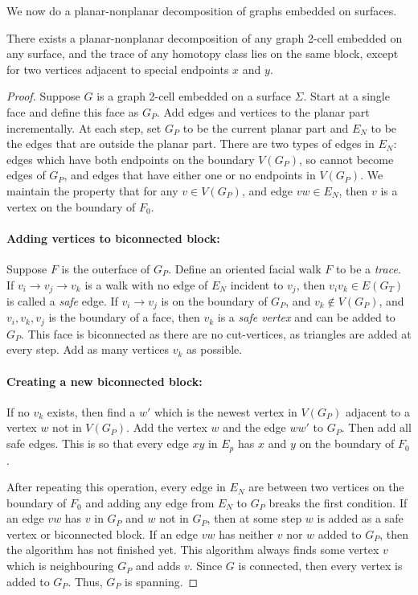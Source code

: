 We now do a planar-nonplanar decomposition of graphs embedded on surfaces.
\begin{proposition}\label{claim:planar_nonplanar_decomp}
	There exists a planar-nonplanar decomposition of any graph 2-cell embedded on any surface, and the trace of any homotopy class lies on the same block, except for two vertices adjacent to special endpoints $x$ and $y$. 
\end{proposition}
\begin{proof}
	Suppose \(G\) is a graph 2-cell embedded on a surface \(\Sigma\). Start at a single face and define this face as $G_P$. Add edges and vertices to the planar part incrementally. At each step, set \(G_P\) to be the current planar part and \(E_N\) to be the edges that are outside the planar part. There are two types of edges in \(E_N\): edges which have both endpoints on the boundary \(V(G_P)\), so cannot become edges of \(G_P\), and edges that have either one or no endpoints in \(V(G_P)\). We maintain the property that for any \(v \in V(G_P)\), and edge \(vw \in E_N\), then \(v\) is a vertex on the boundary of \(F_0\).
	\paragraph{Adding vertices to biconnected block:}
	Suppose $F$ is the outerface of \(G_P\). Define an oriented facial walk $F$ to be a \textit{trace}. If \(v_i \rightarrow v_j \rightarrow v_k\) is a walk with no edge of \(E_N\) incident to \(v_j\), then \(v_i v_k \in E(G_T)\) is called a \textit{safe} edge. If \(v_i \rightarrow v_j\) is on the boundary of \(G_P\), and \(v_k \notin V(G_P)\), and \(v_i,v_k,v_j\) is the boundary of a face, then \(v_k\) is a \textit{safe vertex} and can be added to \(G_P\). This face is biconnected as there are no cut-vertices, as triangles are added at every step. Add as many vertices $v_k$ as possible. 

	\paragraph{Creating a new biconnected block:}
	If no \(v_k\) exists, then find a \(w'\) which is the newest vertex in \(V(G_P)\) adjacent to a vertex \(w\) not in \(V(G_P)\). Add the vertex \(w\) and the edge \(w w'\) to \(G_P\). Then add all safe edges. This is so that every edge $xy$ in \(E_p\) has $x$ and $y$ on the boundary of $F_0$. 
	
	After repeating this operation, every edge in \(E_N\) are between two vertices on the boundary of $F_0$ and adding any edge from $E_N$ to $G_P$ breaks the first condition. If an edge \(vw\) has \(v\) in $G_P$ and $w$ not in $G_P$, then at some step \(w\) is added as a safe vertex or biconnected block. If an edge \(vw\) has neither \(v\) nor \(w\) added to \(G_P\), then the algorithm has not finished yet. This algorithm always finds some vertex $v$ which is neighbouring $G_P$ and adds $v$. Since $G$ is connected, then every vertex is added to $G_P$. Thus, $G_P$ is spanning.
	

\end{proof}

